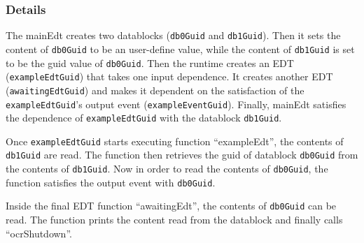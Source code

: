 \subsubsection{Details}

The mainEdt creates two datablocks ({\tt db0Guid} and {\tt db1Guid}).
Then it sets the content of {\tt db0Guid} to be an user-define value,
while the content of {\tt db1Guid} is set to be the guid value of {\tt db0Guid}.
Then the runtime creates an EDT ({\tt exampleEdtGuid}) that takes one input dependence.
It creates another EDT ({\tt awaitingEdtGuid}) and makes it dependent on the satisfaction of the {\tt exampleEdtGuid}'s output event ({\tt exampleEventGuid}).
Finally, mainEdt satisfies the dependence of {\tt exampleEdtGuid} with the datablock {\tt db1Guid}.

Once {\tt exampleEdtGuid} starts executing function ``exampleEdt'', the contents of {\tt db1Guid} are read.
The function then retrieves the guid of datablock {\tt db0Guid} from the contents of {\tt db1Guid}.
Now in order to read the contents of {\tt db0Guid}, the function satisfies the output event with {\tt db0Guid}.

Inside the final EDT function ``awaitingEdt'', the contents of {\tt db0Guid} can be read.
The function prints the content read from the datablock and finally calls ``ocrShutdown''.

